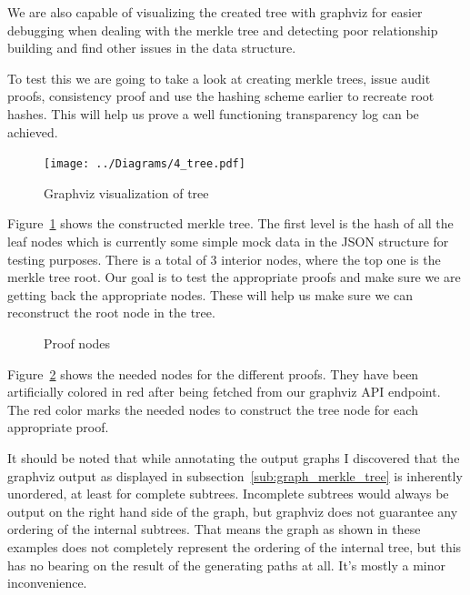 \documentclass[../Main/thesis.tex]{subfiles}
\begin{document}
We are also capable of visualizing the created tree with graphviz for easier
debugging when dealing with the merkle tree and detecting poor relationship
building and find other issues in the data structure.

To test this we are going to take a look at creating merkle trees, issue audit
proofs, consistency proof and use the hashing scheme earlier to recreate root
hashes. This will help us prove a well functioning transparency log can be
achieved.

\begin{figure}[H]
\centering
\texttt{[image: ../Diagrams/4\_tree.pdf]}
\caption{Graphviz visualization of tree}
\label{fig:graph}
\end{figure}


Figure~\ref{fig:graph} shows the constructed merkle tree. The first level is the
hash of all the leaf nodes which is currently some simple mock data in the JSON
structure for testing purposes. There is a total of 3 interior nodes, where the
top one is the merkle tree root. Our goal is to test the appropriate proofs and
make sure we are getting back the appropriate nodes. These will help us make
sure we can reconstruct the root node in the tree.

\begin{figure}[H]
\centering
{}
\qquad
{}
\caption{Proof nodes}
\label{fig:test_proof}
\end{figure}

Figure~\ref{fig:test_proof} shows the needed nodes for the different proofs.
They have been artificially colored in red after being fetched from our graphviz
API endpoint. The red color marks the needed nodes to construct the tree node
for each appropriate proof. 

It should be noted that while annotating the output graphs I discovered that the graphviz
output as displayed in subsection~\ref{sub:graph_merkle_tree} is inherently
unordered, at least for complete subtrees. Incomplete subtrees would always be
output on the right hand side of the graph, but graphviz does not guarantee
any ordering of the internal subtrees. That means the graph as shown in these
examples does not completely represent the ordering of the internal tree, but
this has no bearing on the result of the generating paths at all. It's mostly a
minor inconvenience.
\end{document}
